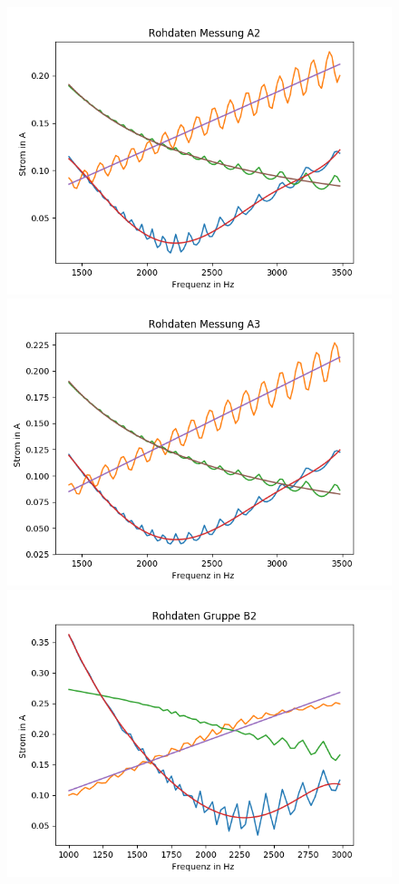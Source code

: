 \documentclass[12pt,a4paper]{article}
\begin{document}
\begin{figure}[h]
\centering
\includegraphics[scale=0.5]{Bilder/Parallel_Rohdaten_2.png}
\includegraphics[scale=0.5]{Bilder/Parallel_Rohdaten_3.png}
\includegraphics[scale=0.5]{Bilder/Parallel_RohdatenB_2.png}
\end{figure}
\end{document}
